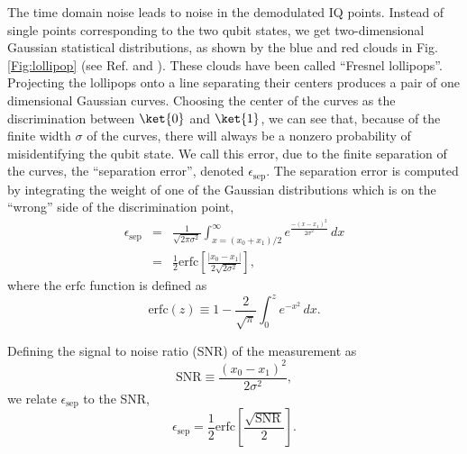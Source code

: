 The time domain noise leads to noise in the demodulated IQ points.
Instead of single points corresponding to the two qubit states, we get two-dimensional Gaussian statistical distributions, as shown by the blue and red clouds in Fig.\,\ref{Fig:lollipop} (see Ref. \cite{Schoukens:DFTNoise1986} and \citeinternaltype {}).
These clouds have been called ``Fresnel lollipops''.
Projecting the lollipops onto a line separating their centers produces a pair of one dimensional Gaussian curves.
Choosing the center of the curves as the discrimination between $\ket{0}$ and $\ket{1}$, we can see that, because of the finite width $\sigma$ of the curves, there will always be a nonzero probability of misidentifying the qubit state.
We call this error, due to the finite separation of the curves, the ``separation error'', denoted $\epsilon_{\text{sep}}$.
The separation error is computed by integrating the weight of one of the Gaussian distributions which is on the ``wrong'' side of the discrimination point, \begin{eqnarray}
\epsilon_{\text{sep}} &=& \frac{1}{\sqrt{2\pi \sigma^2}} \int_{x=(x_0 + x_1)/2}^{\infty} e^{\frac{-(x-x_1)^2}{2\sigma^2}} \, dx \nonumber \\
&=& \frac{1}{2}\textrm{erfc}\left[ \frac{\left| x_0 - x_1 \right|}{2 \sqrt{2 \sigma^2}} \right] , \label{eq:sec:Lollipops:epsilon_sep} \end{eqnarray}
where the $\textrm{erfc}$ function is defined as \begin{equation}
\textrm{erfc}(z) \equiv 1 - \frac{2}{\sqrt{\pi}}\int_0^z e^{-x^2}\,dx . \end{equation}

Defining the signal to noise ratio (SNR) of the measurement as \begin{equation}
\text{SNR} \equiv \frac{(x_0-x_1)^2}{2 \sigma^2} , \label{eq:sec:lollipops:SNR} \end{equation}
we relate $\epsilon_{\text{sep}}$ to the SNR, \begin{equation}
\epsilon_{\text{sep}} = \frac{1}{2} \textrm{erfc} \left[ \frac{\sqrt{\text{SNR}}}{2} \right] . \label{eq:sec:lollipops:e_sepVsSNR} \end{equation}
